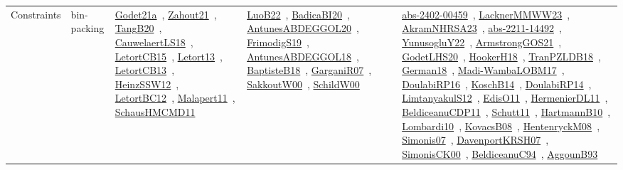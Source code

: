 {\begin{longtable}{lp{3cm}>{\raggedright\arraybackslash}p{6cm}>{\raggedright\arraybackslash}p{6cm}>{\raggedright\arraybackslash}p{8cm}}
Constraints & bin-packing & \href{works/Godet21a.pdf}{Godet21a}~\cite{Godet21a}, \href{works/Zahout21.pdf}{Zahout21}~\cite{Zahout21}, \href{works/TangB20.pdf}{TangB20}~\cite{TangB20}, \href{works/CauwelaertLS18.pdf}{CauwelaertLS18}~\cite{CauwelaertLS18}, \href{works/LetortCB15.pdf}{LetortCB15}~\cite{LetortCB15}, \href{works/Letort13.pdf}{Letort13}~\cite{Letort13}, \href{works/LetortCB13.pdf}{LetortCB13}~\cite{LetortCB13}, \href{works/HeinzSSW12.pdf}{HeinzSSW12}~\cite{HeinzSSW12}, \href{works/LetortBC12.pdf}{LetortBC12}~\cite{LetortBC12}, \href{works/Malapert11.pdf}{Malapert11}~\cite{Malapert11}, \href{works/SchausHMCMD11.pdf}{SchausHMCMD11}~\cite{SchausHMCMD11} & \href{works/LuoB22.pdf}{LuoB22}~\cite{LuoB22}, \href{works/BadicaBI20.pdf}{BadicaBI20}~\cite{BadicaBI20}, \href{works/AntunesABDEGGOL20.pdf}{AntunesABDEGGOL20}~\cite{AntunesABDEGGOL20}, \href{works/FrimodigS19.pdf}{FrimodigS19}~\cite{FrimodigS19}, \href{works/AntunesABDEGGOL18.pdf}{AntunesABDEGGOL18}~\cite{AntunesABDEGGOL18}, \href{works/BaptisteB18.pdf}{BaptisteB18}~\cite{BaptisteB18}, \href{works/GarganiR07.pdf}{GarganiR07}~\cite{GarganiR07}, \href{works/SakkoutW00.pdf}{SakkoutW00}~\cite{SakkoutW00}, \href{works/SchildW00.pdf}{SchildW00}~\cite{SchildW00} & \href{works/abs-2402-00459.pdf}{abs-2402-00459}~\cite{abs-2402-00459}, \href{works/LacknerMMWW23.pdf}{LacknerMMWW23}~\cite{LacknerMMWW23}, \href{works/AkramNHRSA23.pdf}{AkramNHRSA23}~\cite{AkramNHRSA23}, \href{works/abs-2211-14492.pdf}{abs-2211-14492}~\cite{abs-2211-14492}, \href{works/YunusogluY22.pdf}{YunusogluY22}~\cite{YunusogluY22}, \href{works/ArmstrongGOS21.pdf}{ArmstrongGOS21}~\cite{ArmstrongGOS21}, \href{works/GodetLHS20.pdf}{GodetLHS20}~\cite{GodetLHS20}, \href{works/HookerH18.pdf}{HookerH18}~\cite{HookerH18}, \href{works/TranPZLDB18.pdf}{TranPZLDB18}~\cite{TranPZLDB18}, \href{works/German18.pdf}{German18}~\cite{German18}, \href{works/Madi-WambaLOBM17.pdf}{Madi-WambaLOBM17}~\cite{Madi-WambaLOBM17}, \href{works/DoulabiRP16.pdf}{DoulabiRP16}~\cite{DoulabiRP16}, \href{works/KoschB14.pdf}{KoschB14}~\cite{KoschB14}, \href{works/DoulabiRP14.pdf}{DoulabiRP14}~\cite{DoulabiRP14}, \href{works/LimtanyakulS12.pdf}{LimtanyakulS12}~\cite{LimtanyakulS12}, \href{works/EdisO11.pdf}{EdisO11}~\cite{EdisO11}, \href{works/HermenierDL11.pdf}{HermenierDL11}~\cite{HermenierDL11}, \href{works/BeldiceanuCDP11.pdf}{BeldiceanuCDP11}~\cite{BeldiceanuCDP11}, \href{works/Schutt11.pdf}{Schutt11}~\cite{Schutt11}, \href{works/HartmannB10.pdf}{HartmannB10}~\cite{HartmannB10}, \href{works/Lombardi10.pdf}{Lombardi10}~\cite{Lombardi10}, \href{works/KovacsB08.pdf}{KovacsB08}~\cite{KovacsB08}, \href{works/HentenryckM08.pdf}{HentenryckM08}~\cite{HentenryckM08}, \href{works/Simonis07.pdf}{Simonis07}~\cite{Simonis07}, \href{works/DavenportKRSH07.pdf}{DavenportKRSH07}~\cite{DavenportKRSH07}, \href{works/SimonisCK00.pdf}{SimonisCK00}~\cite{SimonisCK00}, \href{works/BeldiceanuC94.pdf}{BeldiceanuC94}~\cite{BeldiceanuC94}, \href{works/AggounB93.pdf}{AggounB93}~\cite{AggounB93}\\

\end{longtable}}
